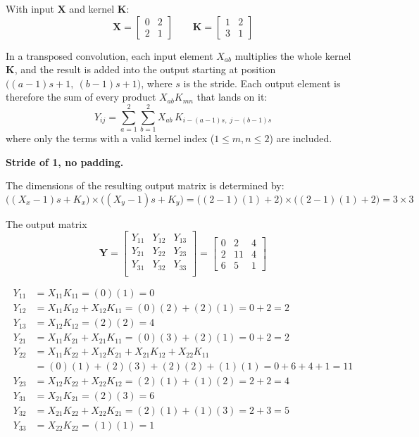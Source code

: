 \documentclass{cisXXX} %
\begin{document}
\HWproblem
With input $\mathbf{X}$ and kernel $\mathbf{K}$:
$$\mathbf{X} = \begin{bmatrix}
    0 & 2 \\
    2 & 1
\end{bmatrix}
\qquad
\mathbf{K} = \begin{bmatrix}
    1 & 2 \\
    3 & 1
\end{bmatrix}$$

In a transposed convolution, each input element $X_{ab}$ multiplies the whole kernel $\mathbf{K}$, and the result is added into the output starting at position $\big((a-1)s+1,\ (b-1)s+1\big)$, where $s$ is the stride. Each output element is therefore the sum of every product $X_{ab}K_{mn}$ that lands on it:
$$Y_{ij} = \sum_{a=1}^{2}\sum_{b=1}^{2} X_{ab}\, K_{i-(a-1)s,\; j-(b-1)s}$$
where only the terms with a valid kernel index ($1 \le m, n \le 2$) are included.

\HWsubproblem
\textbf{Stride of 1, no padding.}

The dimensions of the resulting output matrix is determined by:
$$ \big((X_x - 1)s + K_x\big) \times \big((X_y - 1)s + K_y\big) = \big((2-1)(1)+2\big) \times \big((2-1)(1)+2\big) = 3 \times 3 $$

The output matrix $$\mathbf{Y} = \begin{bmatrix}
    Y_{11}&Y_{12}&Y_{13}\\
    Y_{21}&Y_{22}&Y_{23}\\
    Y_{31}&Y_{32}&Y_{33}\\
\end{bmatrix} = \begin{bmatrix}
    0 & 2 & 4 \\
    2 & 11 & 4 \\
    6 & 5 & 1
\end{bmatrix}$$

\begin{align*}
Y_{11} &= X_{11}K_{11} = (0)(1) = 0 \\
Y_{12} &= X_{11}K_{12} + X_{12}K_{11} = (0)(2) + (2)(1) = 0 + 2 = 2 \\
Y_{13} &= X_{12}K_{12} = (2)(2) = 4 \\
Y_{21} &= X_{11}K_{21} + X_{21}K_{11} = (0)(3) + (2)(1) = 0 + 2 = 2 \\
Y_{22} &= X_{11}K_{22} + X_{12}K_{21} + X_{21}K_{12} + X_{22}K_{11} \\
       &= (0)(1) + (2)(3) + (2)(2) + (1)(1) = 0 + 6 + 4 + 1 = 11 \\
Y_{23} &= X_{12}K_{22} + X_{22}K_{12} = (2)(1) + (1)(2) = 2 + 2 = 4 \\
Y_{31} &= X_{21}K_{21} = (2)(3) = 6 \\
Y_{32} &= X_{21}K_{22} + X_{22}K_{21} = (2)(1) + (1)(3) = 2 + 3 = 5 \\
Y_{33} &= X_{22}K_{22} = (1)(1) = 1
\end{align*}
\end{document}
